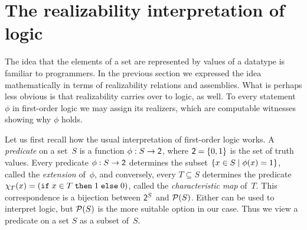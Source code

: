 






\section{The realizability interpretation of logic}
\label{sec:realizability-interpretation}


The idea that the elements of a set are represented by values of a
datatype is familiar to programmers. In the previous section we
expressed the idea mathematically in terms of realizability relations
and assemblies. What is perhaps less obvious is that realizability
carries over to logic, as well. To every statement $\phi$ in
first-order logic we may assign its realizers, which are computable
witnesses showing why $\phi$ holds.

Let us first recall how the usual interpretation of first-order logic
works. A \emph{predicate} on a set~$S$ is a function $\phi : S \to
\mathsf{2}$, where $\mathsf{2} = \{0, 1\}$ is the set of truth values. Every
predicate $\phi : S \to \mathsf{2}$ determines the subset $\{x \in S
  \mid \phi(x) = 1\}$, called the \emph{extension} of~$\phi$, and
conversely, every $T \subseteq S$ determines the predicate $\chi_T(x)
= (\mathtt{if}\;x \in T\;\mathtt{then}\;1\;\mathtt{else}\;0)$, called the \emph{characteristic map}
of~$T$. This correspondence is a bijection between $\mathsf{2}^S$ and
$\mathcal{P}(S)$. Either can be used to interpret logic, but $\mathcal{P}(S)$ is the
more suitable option in our case. Thus we view a predicate on a set
$S$ as a subset of~$S$.

